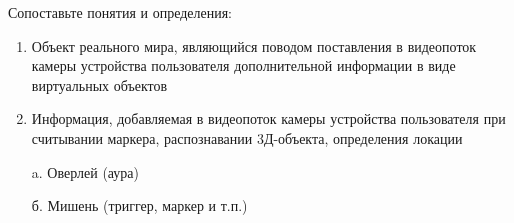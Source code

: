 
Сопоставьте понятия и определения:

\begin{enumerate}
    \item Объект реального мира, являющийся поводом поставления в видеопоток камеры устройства пользователя дополнительной информации в виде виртуальных объектов
    \item Информация, добавляемая в видеопоток камеры устройства пользователя при считывании маркера, распознавании 3Д-объекта, определения локации
\end{enumerate}

\begin{enumerate}
    \item[a.] Оверлей (аура)
    \item[б.] Мишень (триггер, маркер и т.п.)
\end{enumerate}


